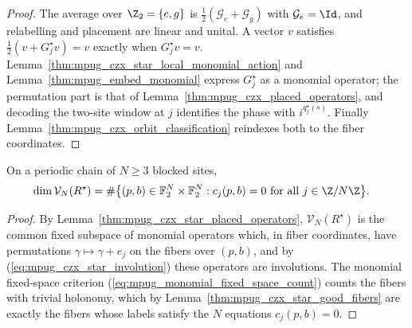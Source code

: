 \begin{proof}\leanok
    The average over $\Z_2=\{e,g\}$ is $\frac12(\mathcal G_e+\mathcal G_g)$ with
    $\mathcal G_e=\Id$, and relabelling and placement are linear and unital. A
    vector $v$ satisfies $\frac12(v+G^\star_jv)=v$ exactly when
    $G^\star_jv=v$. Lemma~\ref{thm:mpug_czx_star_local_monomial_action} and
    Lemma~\ref{thm:mpug_embed_monomial} express $G^\star_j$ as a monomial
    operator; the permutation part is that of
    Lemma~\ref{thm:mpug_czx_placed_operators}, and decoding the two-site
    window at $j$ identifies the phase with $i^{q^\star_j(s)}$. Finally
    Lemma~\ref{thm:mpug_czx_orbit_classification} reindexes both to the
    fiber coordinates.
\end{proof}

\begin{lemma}
    \label{thm:mpug_czx_star_reduction}
    \leanok
    On a periodic chain of $N\geq3$ blocked sites,
    \begin{align}
        \dim\mathcal V_N(R^\star)
         & =\#\bigl\{(p,b)\in\mathbb F_2^N\times\mathbb F_2^N:
        c_j(p,b)=0\text{ for all }j\in\Z/N\Z\bigr\}.
        \label{eq:mpug_czx_star_count}
    \end{align}
\end{lemma}

\begin{proof}\leanok
    By Lemma~\ref{thm:mpug_czx_star_placed_operators},
    $\mathcal V_N(R^\star)$ is the common fixed subspace of monomial operators
    which, in fiber coordinates, have permutations $\gamma\mapsto\gamma+e_j$ on
    the fibers over $(p,b)$, and by (\ref{eq:mpug_czx_star_involution}) these
    operators are involutions. The monomial fixed-space criterion
    (\ref{eq:mpug_monomial_fixed_space_count}) counts the fibers with trivial
    holonomy, which by Lemma~\ref{thm:mpug_czx_star_good_fibers} are exactly
    the fibers whose labels satisfy the $N$ equations $c_j(p,b)=0$.
\end{proof}

